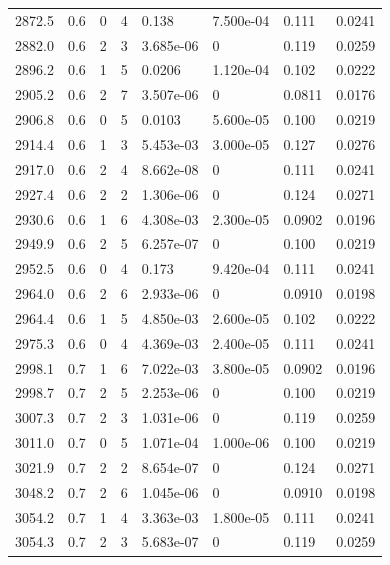 \documentclass[preview]{standalone}
\begin{document}
{{{{{{{\begin{tabular}{L{1.2cm}C{1.2cm} C{0.3cm}C{0.5cm} C{1.4cm}C{1.4cm} C{1.4cm}C{1.4cm}}
  2872.5  &   0.6  & 0     &  4 &  0.138  & 7.500e-04  & 0.111 &  0.0241   \\ 
  2882.0  &   0.6  & 2     &  3 &  3.685e-06  & 0  & 0.119 &  0.0259   \\ 
  2896.2  &   0.6  & 1     &  5 &  0.0206  & 1.120e-04  & 0.102 &  0.0222   \\ 
  2905.2  &   0.6  & 2     &  7 &  3.507e-06  & 0  & 0.0811 &  0.0176   \\ 
  2906.8  &   0.6  & 0     &  5 &  0.0103  & 5.600e-05  & 0.100 &  0.0219   \\ 
  2914.4  &   0.6  & 1     &  3 &  5.453e-03  & 3.000e-05  & 0.127 &  0.0276   \\ 
  2917.0  &   0.6  & 2     &  4 &  8.662e-08  & 0  & 0.111 &  0.0241   \\ 
  2927.4  &   0.6  & 2     &  2 &  1.306e-06  & 0  & 0.124 &  0.0271   \\ 
  2930.6  &   0.6  & 1     &  6 &  4.308e-03  & 2.300e-05  & 0.0902 &  0.0196   \\ 
  2949.9  &   0.6  & 2     &  5 &  6.257e-07  & 0  & 0.100 &  0.0219   \\ 
  2952.5  &   0.6  & 0     &  4 &  0.173  & 9.420e-04  & 0.111 &  0.0241   \\ 
  2964.0  &   0.6  & 2     &  6 &  2.933e-06  & 0  & 0.0910 &  0.0198   \\ 
  2964.4  &   0.6  & 1     &  5 &  4.850e-03  & 2.600e-05  & 0.102 &  0.0222   \\ 
  2975.3  &   0.6  & 0     &  4 &  4.369e-03  & 2.400e-05  & 0.111 &  0.0241   \\ 
  2998.1  &   0.7  & 1     &  6 &  7.022e-03  & 3.800e-05  & 0.0902 &  0.0196   \\ 
  2998.7  &   0.7  & 2     &  5 &  2.253e-06  & 0  & 0.100 &  0.0219   \\ 
  3007.3  &   0.7  & 2     &  3 &  1.031e-06  & 0  & 0.119 &  0.0259   \\ 
  3011.0  &   0.7  & 0     &  5 &  1.071e-04  & 1.000e-06  & 0.100 &  0.0219   \\ 
  3021.9  &   0.7  & 2     &  2 &  8.654e-07  & 0  & 0.124 &  0.0271   \\ 
  3048.2  &   0.7  & 2     &  6 &  1.045e-06  & 0  & 0.0910 &  0.0198   \\ 
  3054.2  &   0.7  & 1     &  4 &  3.363e-03  & 1.800e-05  & 0.111 &  0.0241   \\ 
  3054.3  &   0.7  & 2     &  3 &  5.683e-07  & 0  & 0.119 &  0.0259   \\ 

\end{tabular}}}}}}}}
\end{document}

